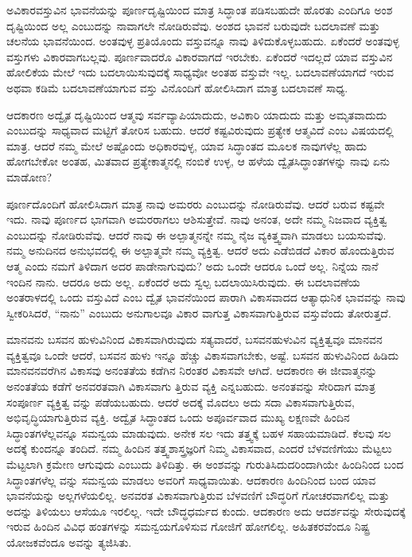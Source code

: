 ಅವಿಕಾರವಸ್ತುವಿನ ಭಾವನೆಯನ್ನು ಪೂರ್ಣದೃಷ್ಟಿಯಿಂದ ಮಾತ್ರ ಸಿದ್ಧಾಂತ ಪಡಿಸಬಹುದೇ ಹೊರತು ಎಂದಿಗೂ ಅಂಶ ದೃಷ್ಟಿಯಿಂದ ಅಲ್ಲ ಎಂಬುದನ್ನು ನಾವಾಗಲೇ ನೋಡಿರುವೆವು. ಅಂಶದ ಭಾವನೆ ಬರುವುದೇ ಬದಲಾವಣೆ ಮತ್ತು ಚಲನೆಯ ಭಾವನೆಯಿಂದ. ಅಂತವುಳ್ಳ ಪ್ರತಿಯೊಂದು ವಸ್ತುವನ್ನೂ ನಾವು ತಿಳಿದುಕೊಳ್ಳಬಹುದು. ಏಕೆಂದರೆ ಅಂತವುಳ್ಳ ವಸ್ತುಗಳು ವಿಕಾರವಾಗಬಲ್ಲವು. ಪೂರ್ಣವಾದರೊ ವಿಕಾರವಾಗದೆ ಇರಬೇಕು. ಏಕೆಂದರೆ ಇದಲ್ಲದೆ ಯಾವ ವಸ್ತುವಿನ ಹೋಲಿಕೆಯ ಮೇಲೆ ಇದು ಬದಲಾಯಿಸುವುದಕ್ಕೆ ಸಾಧ್ಯವೋ ಅಂತಹ ವಸ್ತುವೇ ಇಲ್ಲ. ಬದಲಾವಣೆಯಾಗದೆ ಇರುವ ಅಥವಾ ಕಡಿಮೆ ಬದಲಾವಣೆಯಾಗುವ ವಸ್ತು ವಿನೊಂದಿಗೆ ಹೋಲಿಸಿದಾಗ ಮಾತ್ರ ಬದಲಾವಣೆ ಸಾಧ್ಯ.

ಆದಕಾರಣ ಅದ್ವೈತ ದೃಷ್ಟಿಯಿಂದ ಆತ್ಮವು ಸರ್ವವ್ಯಾಪಿಯಾದುದು, ಅವಿಕಾರಿ ಯಾದುದು ಮತ್ತು ಅಮೃತವಾದುದು ಎಂಬುದನ್ನು ಸಾಧ್ಯವಾದ ಮಟ್ಟಿಗೆ ತೋರಿಸ ಬಹುದು. ಆದರೆ ಕಷ್ಟವಿರುವುದು ಪ್ರತ್ಯೇಕ ಆತ್ಮವಿದೆ ಎಂಬ ವಿಷಯದಲ್ಲಿ ಮಾತ್ರ. ಆದರೆ ನಮ್ಮ ಮೇಲೆ ಅಷ್ಟೊಂದು ಅಧಿಕಾರವುಳ್ಳ, ಯಾವ ಸಿದ್ಧಾಂತದ ಮೂಲಕ ನಾವುಗಳೆಲ್ಲ ಹಾದು ಹೋಗಬೇಕೋ ಅಂತಹ, ಮಿತವಾದ ಪ್ರತ್ಯೇಕಾತ್ಮನಲ್ಲಿ ನಂಬಿಕೆ ಉಳ್ಳ, ಆ ಹಳೆಯ ದ್ವೈತಸಿದ್ಧಾಂತಗಳನ್ನು ನಾವು ಏನು ಮಾಡೋಣ?

ಪೂರ್ಣದೊಂದಿಗೆ ಹೋಲಿಸಿದಾಗ ಮಾತ್ರ ನಾವು ಅಮರರು ಎಂಬುದನ್ನು ನೋಡಿರುವೆವು. ಆದರೆ ಬರುವ ಕಷ್ಟವೇ ಇದು. ನಾವು ಪೂರ್ಣದ ಭಾಗವಾಗಿ ಅಮರರಾಗಲು ಆಶಿಸುತ್ತೇವೆ. ನಾವು ಅನಂತ, ಅದೇ ನಮ್ಮ ನಿಜವಾದ ವ್ಯಕ್ತಿತ್ವ ಎಂಬುದನ್ನು ನೋಡಿರುವೆವು. ಆದರೆ ನಾವು ಈ ಅಲ್ಪಾತ್ಮನನ್ನೇ ನಮ್ಮ ನೈಜ ವ್ಯಕಿತ್ತ್ವವಾಗಿ ಮಾಡಲು ಬಯಸುವೆವು. ನಮ್ಮ ಅನುದಿನದ ಅನುಭವದಲ್ಲಿ ಈ ಅಲ್ಪಾತ್ಮವೇ ನಮ್ಮ ವ್ಯಕ್ತಿತ್ವ. ಆದರೆ ಅದು ಎಡೆಬಿಡದೆ ವಿಕಾರ ಹೊಂದುತ್ತಿರುವ ಆತ್ಮ ಎಂದು ನಮಗೆ ತಿಳಿದಾಗ ಅದರ ಪಾಡೇನಾಗುವುದು? ಅದು ಒಂದೇ ಆದರೂ ಒಂದೆ ಅಲ್ಲ. ನಿನ್ನೆಯ ನಾನೆ ಇಂದಿನ ನಾನು. ಆದರೂ ಅದು ಅಲ್ಲ. ಏಕೆಂದರೆ ಅದು ಸ್ವಲ್ಪ ಬದಲಾಯಿಸಿರುವುದು. ಈ ಬದಲಾವಣೆಯ ಅಂತರಾಳದಲ್ಲಿ ಒಂದು ವಸ್ತುವಿದೆ ಎಂಬ ದ್ವೈತ ಭಾವನೆಯಿಂದ ಪಾರಾಗಿ ವಿಕಾಸವಾದದ ಆತ್ಯಾಧುನಿಕ ಭಾವವನ್ನು ನಾವು ಸ್ವೀಕರಿಸಿದರೆ, “ನಾನು” ಎಂಬುದು ಅನುಗಾಲವೂ ವಿಕಾರ ವಾಗುತ್ತ ವಿಕಾಸವಾಗುತ್ತಿರುವ ವಸ್ತುವೆಂದು ತೋರುತ್ತದೆ.

ಮಾನವನು ಬಸವನ ಹುಳುವಿನಿಂದ ವಿಕಾಸವಾಗಿರುವುದು ಸತ್ಯವಾದರೆ, ಬಸವನಹುಳುವಿನ ವ್ಯಕ್ತಿತ್ವವೂ ಮಾನವನ ವ್ಯಕ್ತಿತ್ವವೂ ಒಂದೇ ಆದರೆ, ಬಸವನ ಹುಳು ಇನ್ನೂ ಹೆಚ್ಚು ವಿಕಾಸವಾಗಬೇಕು, ಅಷ್ಟೆ. ಬಸವನ ಹುಳುವಿನಿಂದ ಹಿಡಿದು ಮಾನವನವರೆಗಿನ ವಿಕಾಸವು ಅನಂತತೆಯ ಕಡೆಗಿನ ನಿರಂತರ ವಿಕಾಸವೇ ಆಗಿದೆ. ಆದಕಾರಣ ಈ ಜೀವಾತ್ಮನನ್ನು ಅನಂತತೆಯ ಕಡೆಗೆ ಅನವರತವಾಗಿ ವಿಕಾಸವಾಗು ತ್ತಿರುವ ವ್ಯಕ್ತಿ ಎನ್ನಬಹುದು. ಅನಂತವನ್ನು ಸೇರಿದಾಗ ಮಾತ್ರ ಸಂಪೂರ್ಣ ವ್ಯಕ್ತಿತ್ವ ವನ್ನು ಪಡೆಯಬಹುದು. ಆದರೆ ಅದಕ್ಕೆ ಮೊದಲು ಅದು ಸದಾ ವಿಕಾಸವಾಗುತ್ತಿರುವ, ಅಭಿವೃದ್ಧಿಯಾಗುತ್ತಿರುವ ವ್ಯಕ್ತಿ. ಅದ್ವೈತ ಸಿದ್ಧಾಂತದ ಒಂದು ಅಪೂರ್ವವಾದ ಮುಖ್ಯ ಲಕ್ಷಣವೇ ಹಿಂದಿನ ಸಿದ್ಧಾಂತಗಳೆಲ್ಲವನ್ನೂ ಸಮನ್ವಯ ಮಾಡುವುದು. ಅನೇಕ ಸಲ ಇದು ತತ್ತ್ವಕ್ಕೆ ಬಹಳ ಸಹಾಯಮಾಡಿದೆ. ಕೆಲವು ಸಲ ಅದಕ್ಕೆ ಕುಂದನ್ನೂ ತಂದಿದೆ. ನಮ್ಮ ಹಿಂದಿನ ತತ್ತ್ವಶಾಸ್ತ್ರಜ್ಞರಿಗೆ ನಿಮ್ಮ ವಿಕಾಸವಾದ, ಎಂದರೆ ಬೆಳವಣಿಗೆಯು ಮೆಟ್ಟಲು ಮೆಟ್ಟಲಾಗಿ ಕ್ರಮೇಣ ಆಗುವುದು ಎಂಬುದು ತಿಳಿದಿತ್ತು. ಈ ಅಂಶವನ್ನು ಗುರುತಿಸಿದುದರಿಂದಾಗಿಯೇ ಹಿಂದಿನಿಂದ ಬಂದ ಸಿದ್ಧಾಂತಗಳೆಲ್ಲ ವನ್ನು ಸಮನ್ವಯ ಮಾಡಲು ಅವರಿಗೆ ಸಾಧ್ಯವಾಯಿತು. ಆದಕಾರಣ ಹಿಂದಿನಿಂದ ಬಂದ ಯಾವ ಭಾವನೆಯನ್ನು ಅಲ್ಲಗಳೆಯಲಿಲ್ಲ. ಅನವರತ ವಿಕಾಸವಾಗುತ್ತಿರುವ ಬೆಳವಣಿಗೆ ಬೌದ್ಧರಿಗೆ ಗೋಚರವಾಗಲಿಲ್ಲ ಮತ್ತು ಅದನ್ನು ತಿಳಿಯಲು ಆಸೆಯೂ ಇರಲಿಲ್ಲ. ಇದೇ ಬೌದ್ಧಧರ್ಮದ ಕುಂದು. ಆದಕಾರಣ ಅದು ಆದರ್ಶವನ್ನು ಸೇರುವುದಕ್ಕೆ ಇರುವ ಹಿಂದಿನ ವಿವಿಧ ಹಂತಗಳನ್ನು ಸಮನ್ವಯಗೊಳಿಸುವ ಗೋಜಿಗೆ ಹೋಗಲಿಲ್ಲ. ಅಹಿತಕರವೆಂದೂ ನಿಷ್ಟ್ರ ಯೋಜಕವೆಂದೂ ಅವನ್ನು ತ್ಯಜಿಸಿತು.

